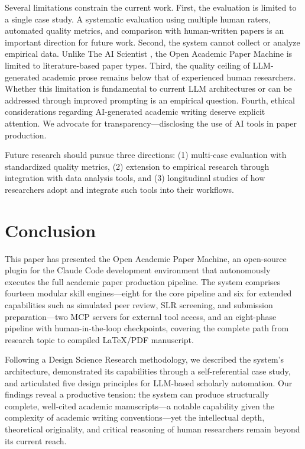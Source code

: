 \documentclass{article}
\begin{document}
Several limitations constrain the current work. First, the evaluation is limited to a single case study. A systematic evaluation using multiple human raters, automated quality metrics, and comparison with human-written papers is an important direction for future work. Second, the system cannot collect or analyze empirical data. Unlike The AI Scientist \citep{lu2024ai_scientist}, the Open Academic Paper Machine is limited to literature-based paper types. Third, the quality ceiling of LLM-generated academic prose remains below that of experienced human researchers. Whether this limitation is fundamental to current LLM architectures or can be addressed through improved prompting is an empirical question. Fourth, ethical considerations regarding AI-generated academic writing deserve explicit attention. We advocate for transparency---disclosing the use of AI tools in paper production.

Future research should pursue three directions: (1) multi-case evaluation with standardized quality metrics, (2) extension to empirical research through integration with data analysis tools, and (3) longitudinal studies of how researchers adopt and integrate such tools into their workflows.


\section{Conclusion}

This paper has presented the Open Academic Paper Machine, an open-source plugin for the Claude Code development environment that autonomously executes the full academic paper production pipeline. The system comprises fourteen modular skill engines---eight for the core pipeline and six for extended capabilities such as simulated peer review, SLR screening, and submission preparation---two MCP servers for external tool access, and an eight-phase pipeline with human-in-the-loop checkpoints, covering the complete path from research topic to compiled \LaTeX/PDF manuscript.

Following a Design Science Research methodology, we described the system's architecture, demonstrated its capabilities through a self-referential case study, and articulated five design principles for LLM-based scholarly automation. Our findings reveal a productive tension: the system can produce structurally complete, well-cited academic manuscripts---a notable capability given the complexity of academic writing conventions---yet the intellectual depth, theoretical originality, and critical reasoning of human researchers remain beyond its current reach.
\end{document}
